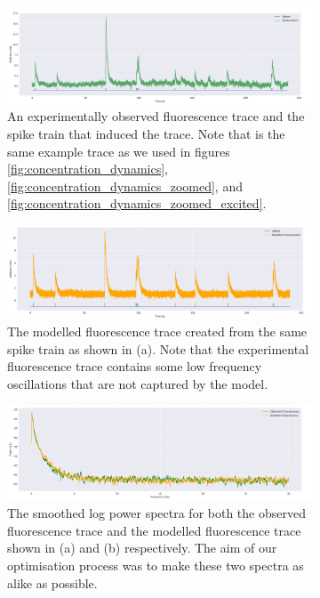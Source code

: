 \documentclass[a4paper,12pt]{article}
\theoremstyle{definition}
\begin{document}

\begin{figure}[p]
  \begin{subfigure}{\textwidth}
    \centering
    \includegraphics[width=\textwidth]{figures/fluorescence_comparison_18_observed.png}
    \caption{An experimentally observed fluorescence trace and the spike train that induced the trace. Note that is the same example trace as we used in figures \ref{fig:concentration_dynamics}, \ref{fig:concentration_dynamics_zoomed}, and \ref{fig:concentration_dynamics_zoomed_excited}.}
  \end{subfigure}
  \begin{subfigure}{\textwidth}
    \centering
    \includegraphics[width=\textwidth]{figures/fluorescence_comparison_18_modelled.png}
    \caption{The modelled fluorescence trace created from the same spike train as shown in (a). Note that the experimental fluorescence trace contains some low frequency oscillations that are not captured by the model.}
  \end{subfigure}
  \begin{subfigure}{\textwidth}
    \centering
    \includegraphics[width=\textwidth]{figures/fluorescence_comparison_18_power.png}
    \caption{The smoothed log power spectra for both the observed fluorescence trace and the modelled fluorescence trace shown in (a) and (b) respectively. The aim of our optimisation process was to make these two spectra as alike as possible.}
  \end{subfigure}
  \caption{}
  \label{fig:fluorescence_comparison}
\end{figure}
\end{document}
